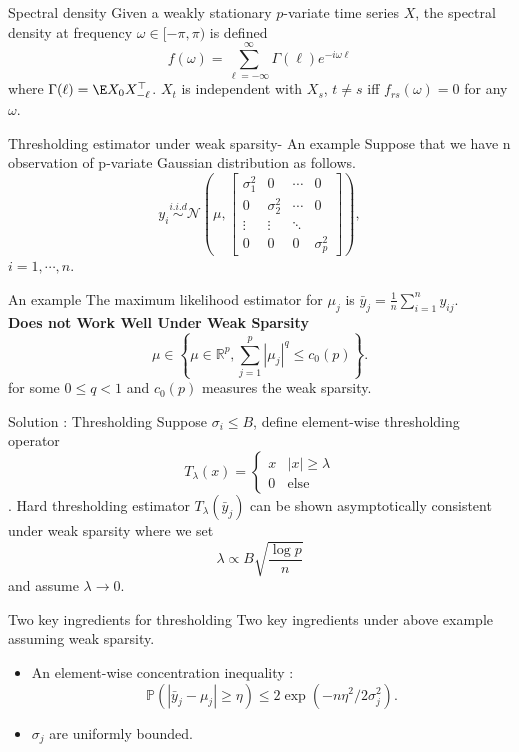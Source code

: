 \documentclass[handout,xcolor={usenames,dvipsnames}]{beamer}
\begin{document}
\begin{frame}{Spectral density}
Given a weakly stationary $p$-variate time series $X$,  the spectral density at frequency $\omega\in [-\pi,  \pi)$ is defined 
\[
f(\omega) = \sum_{\ell = -\infty} ^\infty \Gamma(\ell) e^{-i\omega \ell} 
\]
where $\Gamma(\ell) = \E X_0X_{-\ell}^\top$.   $X_t$ is independent with $X_s$, $t\neq s$ iff $f_{rs}(\omega) = 0$ for any $\omega$. 
\end{frame}

\begin{frame}{Thresholding estimator under weak sparsity- An example}
Suppose that we have n observation of p-variate Gaussian distribution as follows. 
\[
y_i \overset{i.i.d}{\sim} \mathcal{N}\left(\mu, 
\begin{bmatrix}
\sigma^2_1 & 0 & \cdots & 0\\  
0 & \sigma^2_2 & \cdots & 0\\
\vdots & \vdots & \ddots\\
0 & 0& 0& \sigma^2_p
\end{bmatrix}\right),
\]
$i=1,\cdots, n$. 
\end{frame}

\begin{frame}{An example}
The maximum likelihood estimator for $\mu_j$ is $\bar{y}_j = \frac{1}{n}\sum_{i=1}^n y_{ij}$.   \\ 
{\bf Does not Work Well Under Weak Sparsity} 
\[
\mu \in \left\{\mu \in \mathbb{R}^p, \sum_{j=1}^p |\mu_j|^q \le c_0(p)\right\}. 
\]
for some $0\le q<1$ and $c_0(p)$ measures the weak sparsity. 
\end{frame}


\begin{frame}{Solution : Thresholding}
Suppose $\sigma_i\le B$, define element-wise thresholding operator 
\[
T_\lambda(x) = \begin{cases}
x & |x|\ge  \lambda \\
0 & \text{else}
\end{cases} 
\]. 
Hard thresholding estimator $T_\lambda(\bar{y}_j)$ can be shown asymptotically consistent under weak sparsity where we set 
\[
\lambda \propto B   \sqrt{\frac{\log p}{n}}
\] 
and assume $\lambda\rightarrow 0$. 
\end{frame}

\begin{frame}{Two key ingredients for thresholding}
Two key ingredients under above example assuming weak sparsity. \cite{cai2011adaptive}
\begin{itemize}
\item An element-wise concentration inequality : 
\[
\mathbb{P}( |\bar{y}_j - \mu_j | \ge \eta) \le 2 \exp(-n\eta^2/2\sigma_j^2). 
\]
\item $\sigma_j$ are uniformly bounded.  
\end{itemize}
\end{frame}
\end{document}
